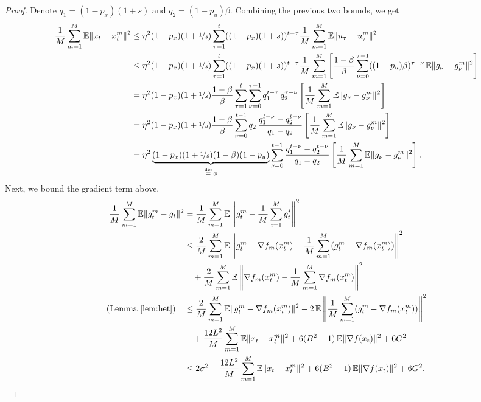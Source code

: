 \begin{proof}
Denote $q_1 = (1-p_x)(1+s)$ and $q_2 = (1-p_u)\beta$. Combining the previous two bounds, we get
\begin{align*}
\frac{1}{M}\sum_{m=1}^{M}\mathbb{E}\|x_t - x_t^m\|^2
&\leq \eta^2(1-p_x)(1+\nicefrac{1}{s})\sum_{\tau=1}^{t}((1-p_x)(1+s))^{t-\tau}\frac{1}{M}\sum_{m=1}^{M}\mathbb{E}\|u_\tau - u_\tau^m\|^2 \\
&\leq \eta^2(1-p_x)(1+\nicefrac{1}{s})\sum_{\tau=1}^{t}((1-p_x)(1+s))^{t-\tau}\frac{1}{M}\sum_{m=1}^{M}\left[\frac{1-\beta}{\beta}\sum_{\nu=0}^{\tau-1}((1-p_u)\beta)^{\tau-\nu}\,\mathbb{E}\|g_\nu - g_\nu^m\|^2\right] \\
&= \eta^2(1-p_x)(1+\nicefrac{1}{s})\frac{1-\beta}{\beta}\sum_{\tau=1}^{t}\sum_{\nu=0}^{\tau-1} q_1^{t-\tau}\,q_2^{\tau-\nu}\left[\frac{1}{M}\sum_{m=1}^{M}\mathbb{E}\|g_\nu - g_\nu^m\|^2\right] \\
&= \eta^2(1-p_x)(1+\nicefrac{1}{s})\frac{1-\beta}{\beta}\sum_{\nu=0}^{t-1} q_2\,\frac{q_1^{t-\nu}-q_2^{t-\nu}}{q_1-q_2}\left[\frac{1}{M}\sum_{m=1}^{M}\mathbb{E}\|g_\nu - g_\nu^m\|^2\right] \\
&= \eta^2 \underbrace{(1-p_x)(1+\nicefrac{1}{s})(1-\beta)(1-p_u)}_{\stackrel{\text{def}}{=}\,\phi}\sum_{\nu=0}^{t-1}\frac{q_1^{t-\nu}-q_2^{t-\nu}}{q_1-q_2}\left[\frac{1}{M}\sum_{m=1}^{M}\mathbb{E}\|g_\nu - g_\nu^m\|^2\right].
\end{align*}
Next, we bound the gradient term above.
\begin{align*}
\frac{1}{M}\sum_{m=1}^{M}\mathbb{E}\|g_t^m - g_t\|^2
&= \frac{1}{M}\sum_{m=1}^{M}\mathbb{E}\left\|g_t^m - \frac{1}{M}\sum_{i=1}^{M}g_t^i\right\|^2 \\
&\leq \frac{2}{M}\sum_{m=1}^{M}\mathbb{E}\left\|g_t^m - \nabla f_m(x_t^m) - \frac{1}{M}\sum_{m=1}^{M}(g_t^m - \nabla f_m(x_t^m))\right\|^2 \\
&\quad + \frac{2}{M}\sum_{m=1}^{M}\mathbb{E}\left\|\nabla f_m(x_t^m) - \frac{1}{M}\sum_{m=1}^{M}\nabla f_m(x_t^m)\right\|^2 \\
\text{(Lemma~\ref{lem:het})} \quad
&\leq \frac{2}{M}\sum_{m=1}^{M}\mathbb{E}\|g_t^m - \nabla f_m(x_t^m)\|^2
   - 2\,\mathbb{E}\left\|\frac{1}{M}\sum_{m=1}^{M}(g_t^m - \nabla f_m(x_t^m))\right\|^2 \\
&\quad + \frac{12L^2}{M}\sum_{m=1}^{M}\mathbb{E}\|x_t - x_t^m\|^2
   + 6(B^2-1)\,\mathbb{E}\|\nabla f(x_t)\|^2 + 6G^2 \\
&\leq 2\sigma^2 + \frac{12L^2}{M}\sum_{m=1}^{M}\mathbb{E}\|x_t - x_t^m\|^2
   + 6(B^2-1)\,\mathbb{E}\|\nabla f(x_t)\|^2 + 6G^2.
\end{align*}


\end{proof}
